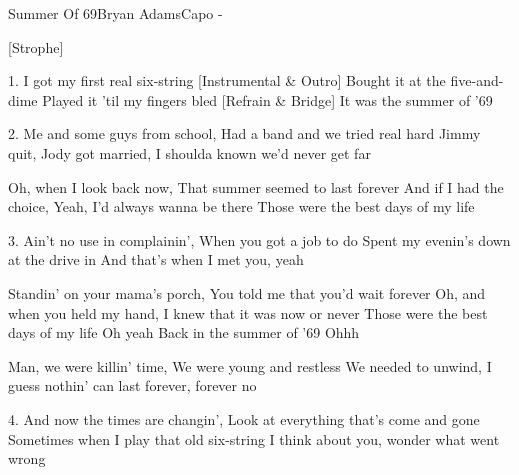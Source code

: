 
\begin{song}{Summer Of 69}{Bryan Adams}{Capo -}

[Strophe]


1. I got my first real six-string
[Instrumental & Outro]
   Bought it at the five-and-dime
   Played it 'til my fingers bled
[Refrain & Bridge]
   It was the summer of '69

2. Me and some guys from school, Had a band and we tried real hard
   Jimmy quit, Jody got married, I shoulda known we'd never get far

    Oh, when I look back now, That summer seemed to last forever
    And if I had the choice, Yeah, I'd always wanna be there
    Those were the best days of my life



3.  Ain't no use in complainin', When you got a job to do
    Spent my evenin's down at the drive in
    And that's when I met you, yeah

    Standin' on your mama's porch, You told me that you'd wait forever
    Oh, and when you held my hand, I knew that it was now or never
    Those were the best days of my life
         Oh yeah        Back in the summer of '69     Ohhh

   Man, we were killin' time, We were young and restless
We needed to unwind, I guess nothin' can last forever, forever no


4. And now the times are changin', Look at everything that's come and gone
   Sometimes when I play that old six-string
   I think about you, wonder what went wrong


\end{song}
